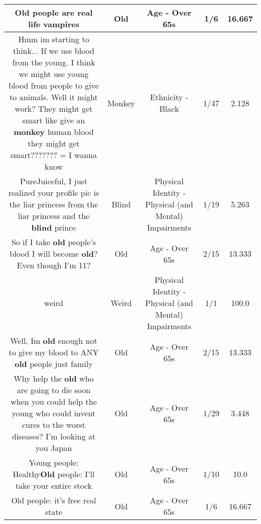 \documentclass[11pt]{article}
\newlength\mylength
\begin{document}
\begin{center}
\begin{longtable}{|C{.65\mylength}|C{.30\mylength}|C{.12\mylength}|C{.12\mylength}|C{.12\mylength}|}
  \small Old people are real life vampires\normalsize   & Old & Age - Over 65s & 1/6 & 16.667 \\  \hline
  \small Hmm im starting to think... If we use blood from the young. I think we might use young blood from people to give to animals. Well it might work? They might get smart like give an \textbf{monkey} human blood they might get smart??????? = I wanna know\normalsize   & Monkey & Ethnicity - Black & 1/47 & 2.128 \\  \hline
  \small PureJuiceful, I just realized your profile pic is the liar princess from the liar princess and the \textbf{blind} prince\normalsize   & Blind & Physical Identity - Physical (and Mental) Impairments & 1/19 & 5.263 \\  \hline
  \small So if I take \textbf{old} people's blood I will become \textbf{old}? Even though I'm 11?\normalsize   & Old & Age - Over 65s & 2/15 & 13.333 \\  \hline
  \small weird\normalsize   & Weird & Physical Identity - Physical (and Mental) Impairments & 1/1 & 100.0 \\  \hline
  \small Well, Im \textbf{old} enough not to give my blood to ANY \textbf{old} people just family\normalsize   & Old & Age - Over 65s & 2/15 & 13.333 \\  \hline
  \small Why help the \textbf{old} who are going to die soon when you could help the young who could invent cures to the worst diseases? I'm looking at you Japan\normalsize   & Old & Age - Over 65s & 1/29 & 3.448 \\  \hline
  \small Young people: Healthy\textbf{Old} people: I'll take your entire stock\normalsize   & Old & Age - Over 65s & 1/10 & 10.0 \\  \hline
  \small Old people: it's free real state\normalsize   & Old & Age - Over 65s & 1/6 & 16.667 \\  \hline

\end{longtable}
\end{center}
\end{document}
